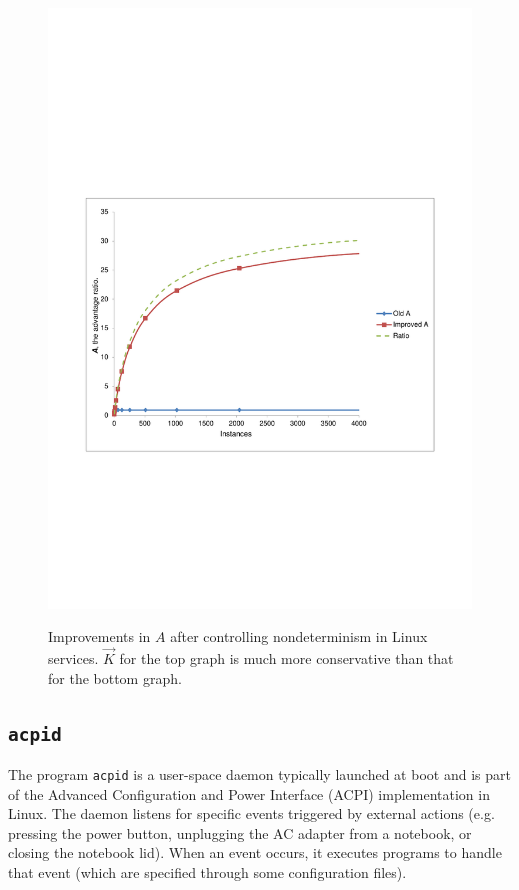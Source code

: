 \begin{figure}
      {\includegraphics[scale=0.85, trim=5cm 8cm 5cm 8cm]{results2.pdf} \label{results2}} 
  \caption[Improvements in $A$ after controlling nondeterminism in Linux services.]%
          {Improvements in $A$ after controlling nondeterminism in Linux services.
          $\vec K$ for the top graph is much more conservative than that for the bottom graph.}

  \label{sumresults}
\end{figure}

\subsection{\texttt{acpid}}
The program {\texttt{acpid}} is a user-space daemon
typically launched at boot and is part of the Advanced Configuration
and Power Interface (ACPI) implementation in Linux.
The daemon listens for specific events triggered by 
external actions (e.g. pressing the power button, unplugging the AC adapter from
a notebook, or closing the notebook lid). When an event occurs,
it executes programs to handle that event (which
are specified through some configuration files).

